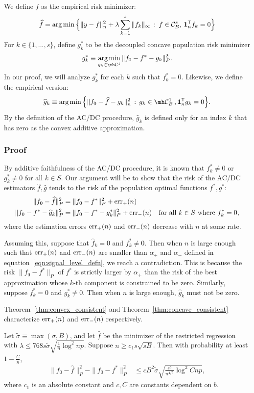 \documentclass[12pt,pdftex,aos,noinfoline,addressasfootnote]{imsart}
\begin{document}
We define $\hat{f}$ as the empirical risk minimizer:
\[
\widehat{f} = \arg\min \Big \{ \| y - f \|_n^2 + \lambda \sum_{k=1}^s \| f_k \|_\infty 
    \,:\, f \in \mathcal{C}^s_B,\, \mbox{\boldmath $1$}_n^{\mathsf{T}} f_k = 0 \Big \}
\]
For $k \in \{1,...,s\}$, define $g^*_k$ to be the decoupled concave population risk minimizer
\[
g^*_k \equiv \argmin_{g_k \in \mh \mathcal{C}^1} \| f_0 - f^* - g_k \|_P^2 .
\]
In our proof, we will analyze $g^*_k$ for each $k$ such that $f^*_k = 0$. Likewise, we define the empirical version:
\[
\hat{g}_k \equiv \argmin \Big\{ \| f_0 - \hat{f} - g_k \|_n^2 \,:\, g_k \in \mh \mathcal{C}^1_B \,, \mathbf{1}_n^\tran g_k = 0 \Big\}.
\]
By the definition of the AC/DC procedure, $\hat{g}_k$ is defined only
for an index $k$ that has zero as the convex additive approximation.


\subsubsection{Proof}
 
By additive faithfulness of the AC/DC procedure, it is known that $f^*_k \neq 0$ or $g^*_k \neq 0$ for all $k \in S$. 
Our argument will be to show that the risk of the AC/DC estimators $\hat{f}, \hat{g}$ tends to the risk of the population optimal functions $f^*, g^*$:
\begin{align*}
\| f_0 - \widehat{f} \|^2_P & = \| f_0 - f^* \|^2_P + \textrm{err}_+(n) \\
\| f_0 - f^* - \widehat{g}_k \|^2_P &=  \| f_0 - f^* - g^*_k \|^2_P + \textrm{err}_-(n) 
       \quad \textrm{for all $k \in S$ where $f^*_k = 0$},
\end{align*}
where the estimation errors $\textrm{err}_+(n)$ and $\textrm{err}_-(n)$ decrease with $n$ at some rate. 

Assuming this, suppose that $\hat{f}_k = 0$ and $f^*_k \neq 0$. Then when $n$ is large
enough such that $\textrm{err}_+(n)$ and $\textrm{err}_-(n)$ are smaller
than $\alpha_+$ and $\alpha_-$ defined in
equation~\eqref{eqn:signal_level_defn}, we reach a contradiction.
This is because the risk $\| f_0 - f^* \|_P$ of $f^*$ is
strictly larger by $\alpha_+$ than the risk of the best approximation
whose $k$-th component is constrained to be zero.
Similarly, suppose $f^*_k = 0$ and $g^*_k \neq 0$. Then when $n$ is large
enough, $\hat{g}_k$ must not be zero.

Theorem~\ref{thm:convex_consistent} and
Theorem~\ref{thm:concave_consistent} characterize $\textrm{err}_+(n)$ and
$\textrm{err}_-(n)$ respectively.

\begin{theorem}
\label{thm:convex_consistent}
Let $\tilde{\sigma} \equiv \max(\sigma, B)$, and let $\hat{f}$ be the
minimizer of the restricted regression with $\lambda \leq 768 s
\tilde{\sigma} \sqrt{ \frac{1}{n} \log^2 np}$.
Suppose $n \geq c_1 s \sqrt{sB}$.
Then with probability at least $1-\frac{C}{n}$,
\begin{align}
\|f_0 - \hat{f} \|_P^2 - \| f_0 - f^* \|_P^2 
&\leq c B^2 \tilde{\sigma} \sqrt{ \frac{s^5}{n^{4/5}} \log^2 Cnp},
\end{align}
where $c_1$ is an absolute constant and $c, C$ are constants dependent on $b$.
\end{theorem}
\end{document}
